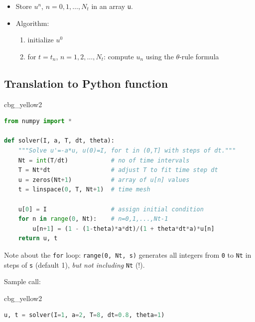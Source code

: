 \documentclass[%
oneside,                 %
final,                   %
10pt]{article}
\newenvironment{_cod_tight}[1]{
   \def\FrameCommand{\colorbox{#1}}
   \FrameRule0.6pt\MakeFramed {\FrameRestore}\vskip3mm}
   {\vskip0mm\endMakeFramed}
\newenvironment{cod}[1]{
\bgroup\rmfamily
\fboxsep=0mm\relax
\begin{_cod_tight}{#1}
\list{}{\parsep=-2mm\parskip=0mm\topsep=0pt\leftmargin=2mm
\rightmargin=2\leftmargin\leftmargin=4pt\relax}
\item\relax}
{\endlist\end{_cod_tight}\egroup}
\begin{document}
\begin{itemize}
 \item Store $u^n$, $n=0,1,\ldots,N_t$ in an array \texttt{u}.

 \item Algorithm:
\begin{enumerate}

  \item initialize $u^0$

  \item for $t=t_n$, $n=1,2,\ldots,N_t$: compute $u_n$ using
     the $\theta$-rule formula
\end{enumerate}

\noindent
\end{itemize}

\noindent
\subsection*{Translation to Python function}

\begin{cod}{cbg_yellow2}\begin{lstlisting}[language=Python,style=simple,xleftmargin=2mm]
from numpy import *

def solver(I, a, T, dt, theta):
    """Solve u'=-a*u, u(0)=I, for t in (0,T] with steps of dt."""
    Nt = int(T/dt)            # no of time intervals
    T = Nt*dt                 # adjust T to fit time step dt
    u = zeros(Nt+1)           # array of u[n] values
    t = linspace(0, T, Nt+1)  # time mesh

    u[0] = I                  # assign initial condition
    for n in range(0, Nt):    # n=0,1,...,Nt-1
        u[n+1] = (1 - (1-theta)*a*dt)/(1 + theta*dt*a)*u[n]
    return u, t
\end{lstlisting}\end{cod}
\noindent

Note about the \texttt{for} loop: \texttt{range(0, Nt, s)} generates all integers
from \texttt{0} to \texttt{Nt} in steps of \texttt{s} (default 1), \emph{but not including} \texttt{Nt} (!).

Sample call:
\begin{cod}{cbg_yellow2}\begin{lstlisting}[language=Python,style=simple,xleftmargin=2mm]
u, t = solver(I=1, a=2, T=8, dt=0.8, theta=1)
\end{lstlisting}\end{cod}
\noindent

\end{document}

